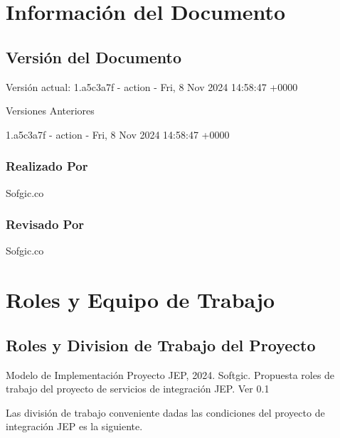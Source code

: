 \documentclass[
  paper=a4,
  ,captions=tableheading
]{scrartcl}
\renewenvironment{quote}{\begin{customblockquote}\list{}{\rightmargin=0em\leftmargin=0em}%
\item\relax\color{blockquote-text}\ignorespaces}{\unskip\unskip\endlist\end{customblockquote}}
\begin{document}
\newpage

\section{Información del
Documento}\label{sec:informaciuxf3n-del-documento}

\subsection{Versión del Documento}\label{sec:versiuxf3n-del-documento}

\begin{quote}
\end{quote}

Versión actual: 1.a5c3a7f - action - Fri, 8 Nov 2024 14:58:47 +0000

Versiones Anteriores

1.a5c3a7f - action - Fri, 8 Nov 2024 14:58:47 +0000

\subsubsection{Realizado Por}\label{sec:realizado-por}

Sofgic.co

\subsubsection{Revisado Por}\label{sec:revisado-por}

Sofgic.co

\newpage

\section{Roles y Equipo de Trabajo}\label{sec:roles-y-equipo-de-trabajo}

\subsection{Roles y Division de Trabajo del
Proyecto}\label{sec:roles-y-division-de-trabajo-del-proyecto}

\begin{quote}
Modelo de Implementación Proyecto JEP, 2024. Softgic. Propuesta roles de
trabajo del proyecto de servicios de integración JEP. Ver 0.1
\end{quote}

Las división de trabajo conveniente dadas las condiciones del proyecto
de integración JEP es la siguiente.
\end{document}
